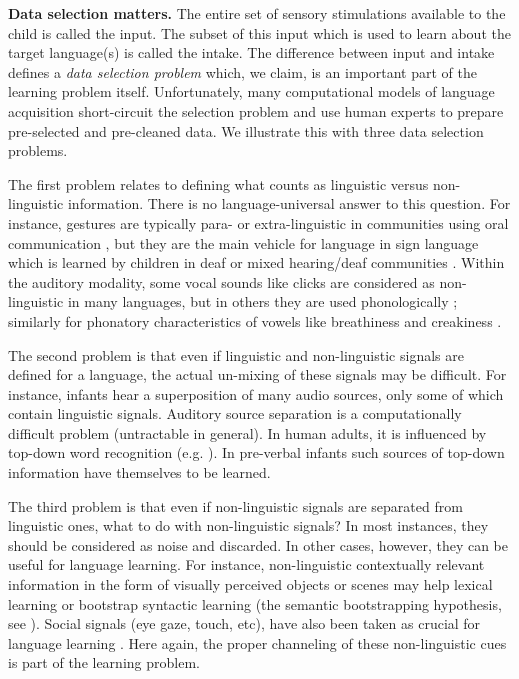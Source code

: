 \documentclass[jou,apacite]{apa6}
\renewcommand{\subsubsection}[1]{\textbf{#1}\hspace{0.3cm}}
\begin{document}
\subsubsection{Data selection matters.}
The entire set of sensory stimulations available to the child is called the input. The subset of this input which is used to learn about the target language(s) is called the intake. The difference between input and intake defines a \textit{data selection problem} which, we claim, is an important part of the learning problem itself. Unfortunately, many computational models of language acquisition short-circuit the selection problem and use human experts to prepare pre-selected and pre-cleaned data. We illustrate this with three data selection problems.%


The first problem relates to defining what counts as linguistic versus non-linguistic information. There is no language-universal answer to this question. For instance, gestures are typically para- or extra-linguistic in communities using oral communication \cite{fowler_91,goldin_05},
but they are the main vehicle for language in sign language \cite{poizner_87}
which is learned by children in deaf or mixed hearing/deaf communities \cite{vancleve_04}.
Within the auditory modality, some vocal sounds like clicks are considered as non-linguistic in many languages, but in others they are used phonologically \cite{best_88}; similarly for phonatory characteristics of vowels like breathiness and creakiness \cite{silverman_95,podesva_2007}. 

The second problem is that even if linguistic and non-linguistic signals are defined for a language, the actual un-mixing of these signals may be difficult. For instance, infants hear a superposition of many audio sources, only some of which contain linguistic signals. Auditory source separation is a computationally difficult problem (untractable in general). In human adults, it is influenced by top-down word recognition (e.g. ). In pre-verbal infants such sources of top-down information have themselves to be learned. 

The third problem is that even if non-linguistic signals are separated from linguistic ones, what to do with non-linguistic signals? In most instances, they should be considered as noise and discarded. In other cases, however, they can be useful for language learning. For instance, non-linguistic contextually relevant information in the form of visually perceived objects or scenes may help lexical learning \cite{roy_2002}  or bootstrap syntactic learning (the semantic bootstrapping hypothesis, see ). 
Social signals (eye gaze, touch, etc), have also been taken as crucial for language learning \cite[among others]{tomasello_03,werker_2005}. Here again, the proper channeling of these non-linguistic cues is part of the learning problem.
\end{document}
